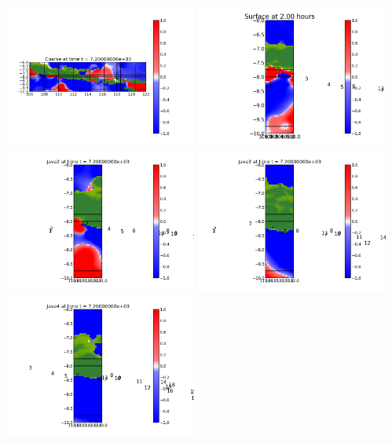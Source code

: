 \documentclass[11pt]{article}
\begin{document}
\vskip 10pt 
\includegraphics[width=0.475\textwidth]{frame0008fig0.png}
\includegraphics[width=0.475\textwidth]{frame0008fig15.png}
\vskip 10pt 
\includegraphics[width=0.475\textwidth]{frame0008fig25.png}
\includegraphics[width=0.475\textwidth]{frame0008fig20.png}
\vskip 10pt 
\includegraphics[width=0.475\textwidth]{frame0008fig30.png}
\end{document}
